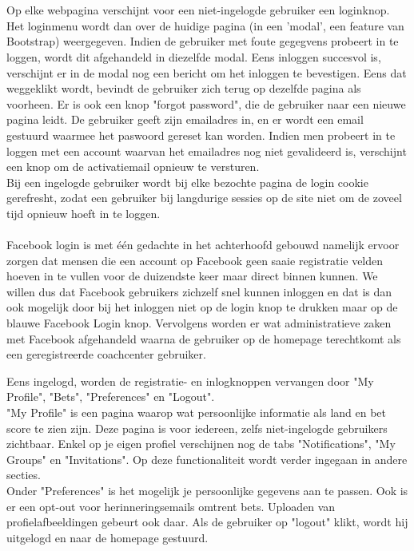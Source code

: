 \documentclass[11pt, a4paper]{article}
\begin{document}
\\
\\
Op elke webpagina verschijnt voor een niet-ingelogde gebruiker een loginknop. Het loginmenu wordt dan over de huidige pagina (in een 'modal', een feature van Bootstrap) weergegeven. Indien de gebruiker met foute gegegvens probeert in te loggen, wordt dit afgehandeld in diezelfde modal. Eens inloggen succesvol is, verschijnt er in de modal nog een bericht om het inloggen te bevestigen. Eens dat weggeklikt wordt, bevindt de gebruiker zich terug op dezelfde pagina als voorheen. Er is ook een knop "forgot password", die de gebruiker naar een nieuwe pagina leidt. De gebruiker geeft zijn emailadres in, en er wordt een email gestuurd waarmee het paswoord gereset kan worden. Indien men probeert in te loggen met een account waarvan het emailadres nog niet gevalideerd is, verschijnt een knop om de activatiemail opnieuw te versturen. \\ Bij een ingelogde gebruiker wordt bij elke bezochte pagina de login cookie gerefresht, zodat een gebruiker bij langdurige sessies op de site niet om de zoveel tijd opnieuw hoeft in te loggen. \\ \\

Facebook login is met één gedachte in het achterhoofd gebouwd namelijk ervoor zorgen dat mensen die een account op Facebook geen saaie registratie velden hoeven in te vullen voor de duizendste keer maar direct binnen kunnen. We willen dus dat Facebook gebruikers zichzelf snel kunnen inloggen en dat is dan ook mogelijk door bij het inloggen niet op de login knop te drukken maar op de blauwe Facebook Login knop. Vervolgens worden er wat administratieve zaken met Facebook afgehandeld waarna de gebruiker op de homepage terechtkomt als een geregistreerde coachcenter gebruiker.

Eens ingelogd, worden de registratie- en inlogknoppen vervangen door "My Profile", "Bets", "Preferences" en "Logout". \\
"My Profile" is een pagina waarop wat persoonlijke informatie als land en bet score te zien zijn. Deze pagina is voor iedereen, zelfs niet-ingelogde gebruikers zichtbaar. Enkel op je eigen profiel verschijnen nog de tabs "Notifications", "My Groups" en "Invitations". Op deze functionaliteit wordt verder ingegaan in andere secties. \\
Onder "Preferences" is het mogelijk je persoonlijke gegevens aan te passen.	Ook is er een opt-out voor herinneringsemails omtrent bets. Uploaden van profielafbeeldingen gebeurt ook daar.
Als de gebruiker op "logout" klikt, wordt hij uitgelogd en naar de homepage gestuurd. \\ \\
\end{document}
